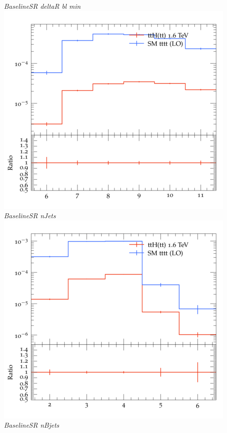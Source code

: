 \documentclass{beamer}
\begin{document}
\begin{frame}
\begin{columns}
\textit{\small BaselineSR deltaR bl min}
\includegraphics[width=\textwidth]{../plots/ttH_1600/tttt_ttH_1LOS/BaselineSR_nJets.png}\\
\textit{\small BaselineSR nJets}
\includegraphics[width=\textwidth]{../plots/ttH_1600/tttt_ttH_1LOS/BaselineSR_nBjets.png}\\
\textit{\small BaselineSR nBjets}
\end{columns}
\end{frame}
\end{document}
